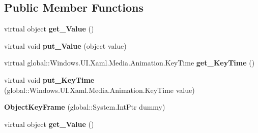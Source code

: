 \subsection*{Public Member Functions}
\begin{DoxyCompactItemize}
\item 
\mbox{\label{class_windows_1_1_u_i_1_1_xaml_1_1_media_1_1_animation_1_1_object_key_frame_ad164bdb41cb8c8711d86923fe1b8e67c}} 
virtual object {\bfseries get\+\_\+\+Value} ()
\item 
\mbox{\label{class_windows_1_1_u_i_1_1_xaml_1_1_media_1_1_animation_1_1_object_key_frame_a7a88c4df7997178c63cfd7b1d90e0db7}} 
virtual void {\bfseries put\+\_\+\+Value} (object value)
\item 
\mbox{\label{class_windows_1_1_u_i_1_1_xaml_1_1_media_1_1_animation_1_1_object_key_frame_a6ae8fd2feca5365340534cb345435679}} 
virtual global\+::\+Windows.\+U\+I.\+Xaml.\+Media.\+Animation.\+Key\+Time {\bfseries get\+\_\+\+Key\+Time} ()
\item 
\mbox{\label{class_windows_1_1_u_i_1_1_xaml_1_1_media_1_1_animation_1_1_object_key_frame_a3d3dee8a9ef100ac928ef177d7c8ec55}} 
virtual void {\bfseries put\+\_\+\+Key\+Time} (global\+::\+Windows.\+U\+I.\+Xaml.\+Media.\+Animation.\+Key\+Time value)
\item 
\mbox{\label{class_windows_1_1_u_i_1_1_xaml_1_1_media_1_1_animation_1_1_object_key_frame_ac48b6f8a34c2efefb0da6485e4eea19e}} 
{\bfseries Object\+Key\+Frame} (global\+::\+System.\+Int\+Ptr dummy)
\item 
\mbox{\label{class_windows_1_1_u_i_1_1_xaml_1_1_media_1_1_animation_1_1_object_key_frame_ad164bdb41cb8c8711d86923fe1b8e67c}} 
virtual object {\bfseries get\+\_\+\+Value} ()
\item 
\mbox{\label{class_windows_1_1_u_i_1_1_xaml_1_1_media_1_1_animation_1_1_object_key_frame_a7a88c4df7997178c63cfd7b1d90e0db7}} 

\end{DoxyCompactItemize}
